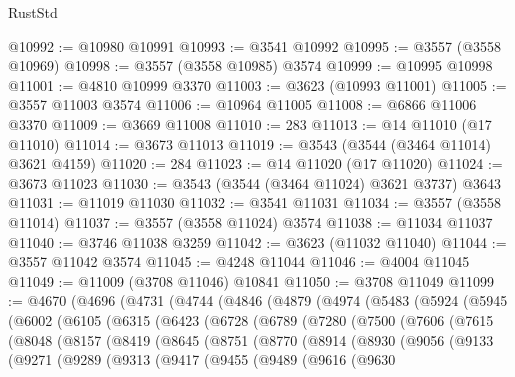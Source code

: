 \begin{lexlean}{RustStd}
\begin{coremodule}
@10992 := @10980 @10991
@10993 := @3541 @10992
@10995 := @3557 (@3558 @10969)
@10998 := @3557 (@3558 @10985) @3574
@10999 := @10995 @10998
@11001 := @4810 @10999 @3370
@11003 := @3623 (@10993 @11001)
@11005 := @3557 @11003 @3574
@11006 := @10964 @11005
@11008 := @6866 @11006 @3370
@11009 := @3669 @11008
@11010 := 283
@11013 := @14 @11010 (@17 @11010)
@11014 := @3673 @11013
@11019 := @3543 (@3544 (@3464 @11014) @3621 @4159)
@11020 := 284
@11023 := @14 @11020 (@17 @11020)
@11024 := @3673 @11023
@11030 := @3543 (@3544 (@3464 @11024) @3621 @3737) @3643
@11031 := @11019 @11030
@11032 := @3541 @11031
@11034 := @3557 (@3558 @11014)
@11037 := @3557 (@3558 @11024) @3574
@11038 := @11034 @11037
@11040 := @3746 @11038 @3259
@11042 := @3623 (@11032 @11040)
@11044 := @3557 @11042 @3574
@11045 := @4248 @11044
@11046 := @4004 @11045
@11049 := @11009 (@3708 @11046) @10841
@11050 := @3708 @11049
@11099 := @4670
    (@4696
      (@4731
        (@4744
          (@4846
            (@4879
              (@4974
                (@5483
                  (@5924
                    (@5945
                      (@6002
                        (@6105
                          (@6315
                            (@6423
                              (@6728
                                (@6789
                                  (@7280
                                    (@7500
                                      (@7606
                                        (@7615
                                          (@8048
                                            (@8157
                                              (@8419
                                                (@8645
                                                  (@8751
                                                    (@8770
                                                      (@8914
                                                        (@8930
                                                          (@9056
                                                            (@9133
                                                              (@9271
                                                                (@9289
                                                                  (@9313
                                                                    (@9417
                                                                      (@9455
                                                                        (@9489
                                                                          (@9616
                                                                            (@9630

\end{coremodule}
\end{lexlean}
